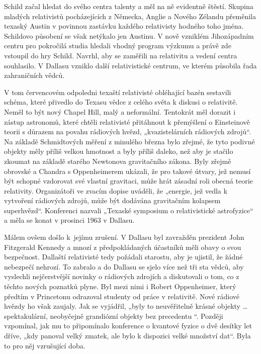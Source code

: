   Schild začal hledat do svého centra talenty a měl na ně evidentně štěstí. Skupina mladých
  relativistů pocházejících z Německa, Anglie a Nového Zélandu přeměnila texaský Austin v povinnou
  zastávku každého relativisty hodného toho jména. Schildovo působení se však netýkalo jen Austinu.
  V nově vzniklém Jihozápadním centru pro pokročilá studia hledali vhodný program výzkumu a právě
  zde vstoupil do hry Schild. Navrhl, aby se zaměřili na relativitu a vedení centra souhlasilo. V
  Dallasu vzniklo další relativistické centrum, ve kterém působila řada zahraničních vědců. 

  V tom červencovém odpoledni texaští relativisté obléhající bazén sestavili schéma, které přivedlo
  do Texasu vědce z celého světa k diskusi o relativitě. Neměl to být nový Chapel Hill, malý a
  neformální. Tentokrát měl dorazit i zástup astronomů, které chtěli relativisté přitáhnout k
  přemýšlení o Einsteinově teorii s důrazem na povahu rádiových hvězd, „kvazistelárních rádiových
  zdrojů“. Na základě Schmidtových měření z minulého března bylo zřejmé, že tyto podivné objekty
  měly příliš velkou hmotnost a byly příliš daleko, než aby je stačilo zkoumat na základě starého
  Newtonova gravitačního zákona. Byly zřejmě obrovské a Chandra s Oppenheimerem ukázali, že pro
  takové útvary, jež nemusí být schopné vzdorovat své vlastní gravitaci, může hrát zásadní roli
  obecná teorie relativity. Organizátoři ve zvacím dopise uváděli, že „energie, jež vedla k
  vytvoření rádiových zdrojů, může být dodávána gravitačním kolapsem superhvězd“. Konferenci nazvali
  „Texaské symposium o relativistické astrofyzice“ a měla se konat v prosinci 1963 v Dallasu. 

  Málem ovšem došlo k jejímu zrušení. V Dallasu byl zavražděn prezident John Fitzgerald Kennedy a
  mnozí z předpokládaných účastníků měli obavy o svou bezpečnost. Dallaští relativisté tedy požádali
  starostu, aby je ujistil, že žádné nebezpečí nehrozí. To zabralo a do Dallasu se sjelo více než
  tři sta vědců, aby vyslechli nejčerstvější novinky o rádiových zdrojích a diskutovali o tom, co z
  těchto nových poznatků plyne. Byl mezi nimi i Robert Oppenheimer, který předtím v Princetonu
  odrazoval studenty od práce v relativitě. Nové rádiové hvězdy ho však zaujaly. Jak se vyjádřil,
  „byly to neuvěřitelně krásné objekty … spektakulární, neobyčejně grandiózní objekty bez precedentu
  “. Později vzpomínal, jak mu to připomínalo konference o kvantové fyzice o dvě desítky let dříve,
  „kdy panoval velký zmatek, ale bylo k dispozici velké množství dat“. Byla to pro něj vzrušující
  doba. 

